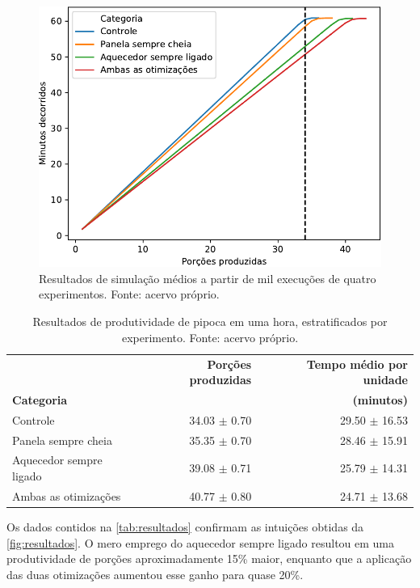 \documentclass[12pt]{article}
\begin{document}
\begin{figure}[ht]
    \centering
    \includegraphics[width=\textwidth]{figuras/resultados}
    \caption{Resultados de simulação médios a partir de mil execuções de quatro experimentos. Fonte: acervo próprio.}
    \label{fig:resultados}
\end{figure}

\begin{table}[t]
    \centering
    \caption{Resultados de produtividade de pipoca em uma hora, estratificados por experimento. Fonte: acervo próprio.}
    \begin{tabular}{lrr}
        \toprule
        {} & \textbf{Porções produzidas} & \textbf{Tempo médio por unidade}\\
        \textbf{Categoria} & {} & {\textbf{(minutos)}}\\
        \midrule
        Controle                & 34.03 $\pm$ 0.70 & 29.50 $\pm$ 16.53\\
        Panela sempre cheia     & 35.35 $\pm$ 0.70 & 28.46 $\pm$ 15.91\\
        Aquecedor sempre ligado & 39.08 $\pm$ 0.71 & 25.79 $\pm$ 14.31\\
        Ambas as otimizações    & 40.77 $\pm$ 0.80 & 24.71 $\pm$ 13.68\\
        \bottomrule
    \end{tabular}
    \label{tab:resultados}
\end{table}

Os dados contidos na \autoref{tab:resultados} confirmam as intuições obtidas da \autoref{fig:resultados}. O mero emprego do aquecedor sempre ligado resultou em uma produtividade de porções aproximadamente 15\% maior, enquanto que a aplicação das duas otimizações aumentou esse ganho para quase 20\%.
\end{document}
